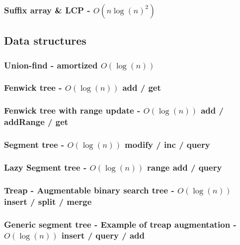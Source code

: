 \documentclass[landscape,a4paper,twocolumn,10pt]{report}
\begin{document}
\subsubsection{Suffix array \& LCP - $O(n \log(n)^2)$}


\subsection*{Data structures}
\label{datastruct}

\subsubsection{Union-find - amortized $O(\log(n))$}


\subsubsection{Fenwick tree - $O(\log(n))$ add / get}


\subsubsection{Fenwick tree with range update - $O(\log(n))$ add / addRange / get}


\subsubsection{Segment tree - $O(\log(n))$ modify / inc / query}


\subsubsection{Lazy Segment tree - $O(\log(n))$ range add / query}


\subsubsection{Treap - Augmentable binary search tree - $O(\log(n))$ insert / split / merge}


\subsubsection{Generic segment tree - Example of treap augmentation - $O(\log(n))$ insert / query / add}

\end{document}
